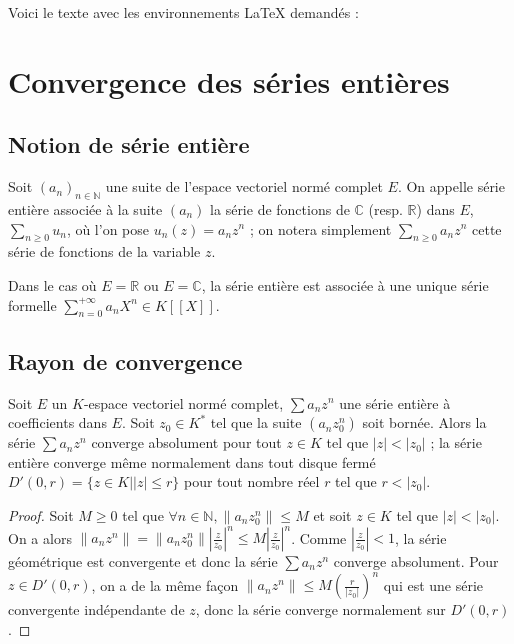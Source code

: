Voici le texte avec les environnements LaTeX demandés :

\section{Convergence des séries entières}

\subsection{Notion de série entière}

\begin{de}
Soit $(a_n)_{n \in \mathbb{N}}$ une suite de l'espace
vectoriel normé complet $E$. On appelle série entière associée à la suite
$(a_n)$ la série de fonctions de $\mathbb{C}$ (resp. $\mathbb{R}$) dans $E$,
$\sum_{n \geq 0} u_n$, où l'on pose $u_n(z) = a_n z^n$ ; on notera simplement
$\sum_{n \geq 0} a_n z^n$ cette série de fonctions de la
variable $z$.
\end{de}

\begin{rem}
Dans le cas où $E = \mathbb{R}$ ou $E = \mathbb{C}$, la série entière est
associée à une unique série formelle
$\sum_{n=0}^{+\infty} a_n X^n \in K[[X]]$.
\end{rem}

\subsection{Rayon de convergence}

\begin{lem}[Abel]
Soit $E$ un $K$-espace vectoriel normé complet,
$\sum a_n z^n$ une série entière à coefficients dans $E$. Soit
$z_0 \in K^*$ tel que la suite
$(a_n z_0^n)$ soit bornée. Alors la série
$\sum a_n z^n$ converge absolument pour tout $z \in K$ tel que
$|z| < |z_0|$ ;
la série entière converge même normalement dans tout disque fermé $D'(0,r) =
\{z \in K | |z| \leq r\}$
pour tout nombre réel $r$ tel que $r < |z_0|$.
\end{lem}

\begin{proof}
Soit $M \geq 0$ tel que $\forall n \in \mathbb{N},
\|a_n z_0^n\| \leq M$ et soit $z \in K$ tel que $|z| < |z_0|$. On a alors
$\|a_n z^n\| = \|a_n z_0^n\| \left|\frac{z}{z_0}\right|^n \leq M \left|\frac{z}{z_0}\right|^n$. Comme $\left|\frac{z}{z_0}\right| < 1$, la série géométrique est convergente et donc la série
$\sum a_n z^n$ converge absolument. Pour $z \in D'(0,r)$, on a
de la même façon
$\|a_n z^n\| \leq M \left(\frac{r}{|z_0|}\right)^n$ qui est une
série convergente indépendante de $z$, donc la série converge normalement
sur $D'(0,r)$.
\end{proof}

